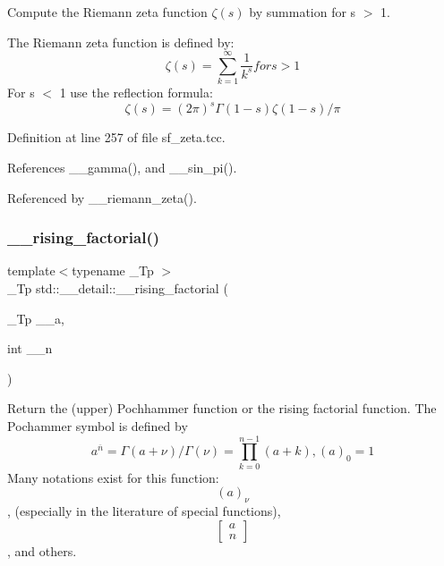 Compute the Riemann zeta function $ \zeta(s) $ by summation for s $>$ 1. 

The Riemann zeta function is defined by\+: \[ \zeta(s) = \sum_{k=1}^{\infty} \frac{1}{k^{s}} for s > 1 \] For s $<$ 1 use the reflection formula\+: \[ \zeta(s) = (2\pi)^s \Gamma(1-s) \zeta(1-s) / \pi \] 

Definition at line 257 of file sf\+\_\+zeta.\+tcc.



References \+\_\+\+\_\+gamma(), and \+\_\+\+\_\+sin\+\_\+pi().



Referenced by \+\_\+\+\_\+riemann\+\_\+zeta().

\mbox{\label{namespacestd_1_1____detail_a5a4c41ee568639f8de4508051da9954a}} 
\subsubsection{\texorpdfstring{\+\_\+\+\_\+rising\+\_\+factorial()}{\_\_rising\_factorial()}\hspace{0.1cm}{\footnotesize\ttfamily [1/2]}}
{\footnotesize\ttfamily template$<$typename \+\_\+\+Tp $>$ \\
\+\_\+\+Tp std\+::\+\_\+\+\_\+detail\+::\+\_\+\+\_\+rising\+\_\+factorial (\begin{DoxyParamCaption}\item[{\+\_\+\+Tp}]{\+\_\+\+\_\+a,  }\item[{int}]{\+\_\+\+\_\+n }\end{DoxyParamCaption})}



Return the (upper) Pochhammer function or the rising factorial function. The Pochammer symbol is defined by \[ a^{\overline{n}} = \Gamma(a + \nu) / \Gamma(\nu) = \prod_{k=0}^{n-1} (a + k), (a)_0 = 1 \] Many notations exist for this function\+: \[ (a)_\nu \], (especially in the literature of special functions), \[ \left[ \begin{array}{c} a \\ n \end{array} \right] \], and others. 



